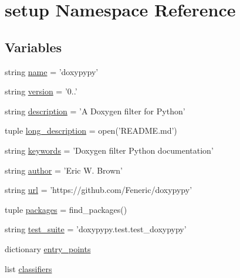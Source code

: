 \hypertarget{namespacesetup}{\section{setup Namespace Reference}
\label{namespacesetup}
}
\subsection*{Variables}
\begin{DoxyCompactItemize}
\item 
string \hyperlink{namespacesetup_a61de3710bf6c9d78c0afa352263f8b09}{name} = 'doxypypy'
\item 
string \hyperlink{namespacesetup_ab177531e7a80674a3db3de2d79eb8be7}{version} = '0..'
\item 
string \hyperlink{namespacesetup_ade8aa54df2083113a10326ea2fe7934b}{description} = 'A Doxygen filter for Python'
\item 
tuple \hyperlink{namespacesetup_acaf26e8be236d4bfa129f4c0f4f53baf}{long\-\_\-description} = open('R\-E\-A\-D\-M\-E.\-md')
\item 
string \hyperlink{namespacesetup_a13f1455f03aed281ae4f7619aaa7f57b}{keywords} = 'Doxygen filter Python documentation'
\item 
string \hyperlink{namespacesetup_ac83393287a89728d636e4ae9f4ac914f}{author} = 'Eric W. Brown'
\item 
string \hyperlink{namespacesetup_a3376e8b9735800b5b9e455914cee908d}{url} = 'https\-://github.\-com/Feneric/doxypypy'
\item 
tuple \hyperlink{namespacesetup_aac31bc6390743c46ed466881a9d62eb2}{packages} = find\-\_\-packages()
\item 
string \hyperlink{namespacesetup_aaedcd7e0bf209e42aef838657a6bba4a}{test\-\_\-suite} = 'doxypypy.\-test.\-test\-\_\-doxypypy'
\item 
dictionary \hyperlink{namespacesetup_a39223b27836ad859b536b5b1dc23f322}{entry\-\_\-points}
\item 
list \hyperlink{namespacesetup_a2d96dddd66b7833bbb2db38dbbe55a02}{classifiers}
\end{DoxyCompactItemize}


